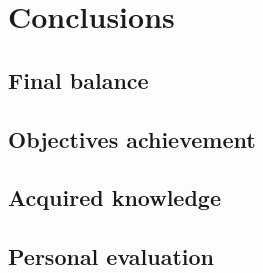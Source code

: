 
\chapter{Conclusions}
\label{cap:conclusioni}

\section{Final balance}

\section{Objectives achievement}

\section{Acquired knowledge}

\section{Personal evaluation}
